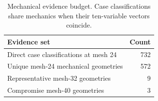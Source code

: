 \begin{table}[t]
\centering
\caption{Mechanical evidence budget. Case classifications share mechanics when their ten-variable vectors coincide.}
\label{tab:verification_pool_fast}
\begin{tabular}{lr}
\toprule
Evidence set & Count \\
\midrule
Direct case classifications at mesh 24 & 732 \\
Unique mesh-24 mechanical geometries & 572 \\
Representative mesh-32 geometries & 9 \\
Compromise mesh-40 geometries & 3 \\
\bottomrule
\end{tabular}
\end{table}
